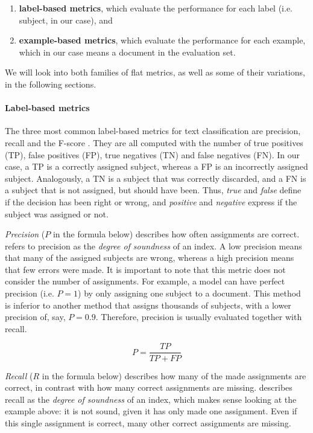 \begin{enumerate}
    \item \textbf{label-based metrics}, which evaluate the performance for each label (i.e. subject, in our case), and
    \item \textbf{example-based metrics}, which evaluate the performance for each example, which in our case means a document in the evaluation set.
\end{enumerate}

We will look into both families of flat metrics, as well as some of their variations, in the following sections.

\paragraph{Label-based metrics} \mbox{}

The three most common label-based metrics for text classification are precision, recall and the F-score \cite{sebastianini2002machine}. They are all computed with the number of true positives (TP), false positives (FP), true negatives (TN) and false negatives (FN). In our case, a TP is a correctly assigned subject, whereas a FP is an incorrectly assigned subject. Analogously, a TN is a subject that was correctly discarded, and a FN is a subject that is not assigned, but should have been. Thus, \textit{true} and \textit{false} define if the decision has been right or wrong, and \textit{positive} and \textit{negative} express if the subject was assigned or not.

\textit{Precision} ($P$ in the formula below) describes how often assignments are correct. \cite{sebastianini2002machine} refers to precision as the \textit{degree of soundness} of an index. A low precision means that many of the assigned subjects are wrong, whereas a high precision means that few errors were made. It is important to note that this metric does not consider the number of assignments. For example, a model can have perfect precision (i.e. $P=1$) by only assigning one subject to a document. This method is inferior to another method that assigns thousands of subjects, with a lower precision of, say, $P=0.9$. Therefore, precision is usually evaluated together with recall.

$$ P = \frac{TP}{TP + FP} $$

\textit{Recall} ($R$ in the formula below) describes how many of the made assignments are correct, in contrast with how many correct assignments are missing. \cite{sebastianini2002machine} describes recall as the \textit{degree of soundness} of an index, which makes sense looking at the example above: it is not sound, given it has only made one assignment. Even if this single assignment is correct, many other correct assignments are missing.

